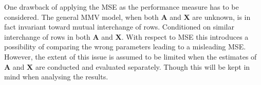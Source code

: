 One drawback of applying the MSE as the performance measure has to be considered. The general MMV model, when both $\textbf{A}$ and $\textbf{X}$ are unknown, is in fact invariant toward mutual interchange of rows. Conditioned on similar interchange of rows in both $\textbf{A}$ and $\textbf{X}$. With respect to MSE this introduces a possibility of comparing the wrong parameters leading to a misleading MSE. However, the extent of this issue is assumed to be limited when the estimates of $\textbf{A}$ and $\textbf{X}$ are conducted and evaluated separately. Though this will be kept in mind when analysing the results.        

